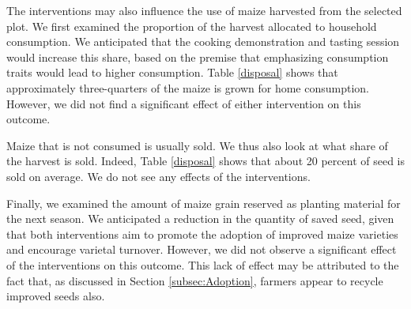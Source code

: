 \documentclass[english]{article}\usepackage[]{graphicx}\usepackage[]{xcolor}
\begin{document}
The interventions may also influence the use of maize harvested from
the selected plot. We first examined the proportion of the harvest
allocated to household consumption. We anticipated that the cooking
demonstration and tasting session would increase this share, based
on the premise that emphasizing consumption traits would lead to higher
consumption. Table \ref{disposal} shows that approximately three-quarters
of the maize is grown for home consumption. However, we did not find
a significant effect of either intervention on this outcome.

Maize that is not consumed is usually sold. We thus also look at what
share of the harvest is sold. Indeed, Table \ref{disposal} shows
that about 20 percent of seed is sold on average. We do not see any
effects of the interventions.

Finally, we examined the amount of maize grain reserved as planting
material for the next season. We anticipated a reduction in the quantity
of saved seed, given that both interventions aim to promote the adoption
of improved maize varieties and encourage varietal turnover. However,
we did not observe a significant effect of the interventions on this
outcome. This lack of effect may be attributed to the fact that, as
discussed in Section \ref{subsec:Adoption}, farmers appear to recycle
improved seeds also.
\end{document}
